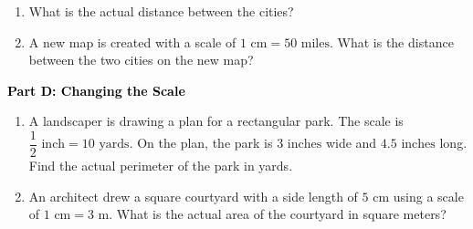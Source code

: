 \documentclass[12pt, letterpaper, fleqn]{article}
\newcommand{\blanklong}{\underline{\hspace{6.5cm}}}
\begin{document}
\vspace{3mm}

\begin{enumerate}[itemsep=4.2cm, leftmargin=0.6cm, resume]
\item What is the actual distance between the cities? \blanklong
\item A new map is created with a scale of $1\text{ cm} = 50\text{ miles}$. What is the distance between the two cities on the new map? \blanklong
\end{enumerate}

\newpage

\begin{tcolorbox}[colback=customteal!20]
\large\textcolor{black}{\textbf{Part D: Changing the Scale}}
\end{tcolorbox}

\vspace{3mm}

\begin{enumerate}[itemsep=4.2cm, leftmargin=0.6cm, resume]
\item A landscaper is drawing a plan for a rectangular park. The scale is $\dfrac{1}{2}\text{ inch} = 10\text{ yards}$. On the plan, the park is $3\text{ inches}$ wide and $4.5\text{ inches}$ long. Find the actual perimeter of the park in yards.
\item An architect drew a square courtyard with a side length of $5\text{ cm}$ using a scale of $1\text{ cm} = 3\text{ m}$. What is the actual area of the courtyard in square meters?
\end{enumerate}
\end{document}
